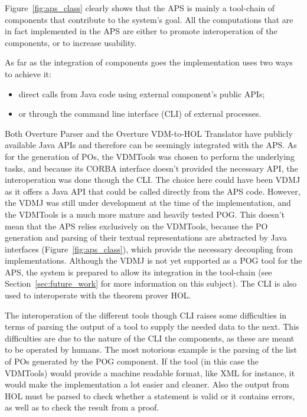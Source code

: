 \documentclass[]{article}
\begin{document}
Figure~\ref{fig:aps_class} clearly shows that the APS is mainly a tool-chain of components that contribute to the system's goal.
All the computations that are in fact implemented in the APS are either to promote interoperation of the components, or to increase usability.

As far as the integration of components goes the implementation uses two ways to achieve it:
\begin{itemize}
  \item direct calls from Java code using external component's public APIs;
  \item or through the command line interface (CLI) of external processes.
\end{itemize}

Both Overture Parser and the Overture VDM-to-HOL Translator have publicly available Java APIs and therefore can be seemingly integrated with the APS.
As for the generation of POs, the VDMTools was chosen to perform the underlying tasks, and because its CORBA interface doesn't provided the necessary API, the interoperation was done though the CLI.
The choice here could have been VDMJ as it offers a Java API that could be called directly from the APS code.
However, the VDMJ was still under development at the time of the implementation, and the VDMTools is a much more mature and heavily tested POG.
This doesn't mean that the APS relies exclusively on the VDMTools, because the PO generation and parsing of their textual representations are abstracted by Java interfaces (Figure~\ref{fig:aps_class}), which provide the necessary decoupling from implementations.
Although the VDMJ is not yet supported as a POG tool for the APS, the system is prepared to allow its integration in the tool-chain (see Section~\ref{sec:future_work} for more information on this subject).
The CLI is also used to interoperate with the theorem prover HOL.

The interoperation of the different tools though CLI raises some difficulties in terms of parsing the output of a tool to supply the needed data to the next.
This difficulties are due to the nature of the CLI the components, as these are meant to be operated by humans.
The most notorious example is the parsing of the list of POs generated by the POG component.
If the tool (in this case the VDMTools) would provide a machine readable format, like XML for instance, it would make the implementation a lot easier and cleaner.
Also the output from HOL must be parsed to check whether a statement is valid or it contains errors, as well as to check the result from a  proof.
\end{document}
